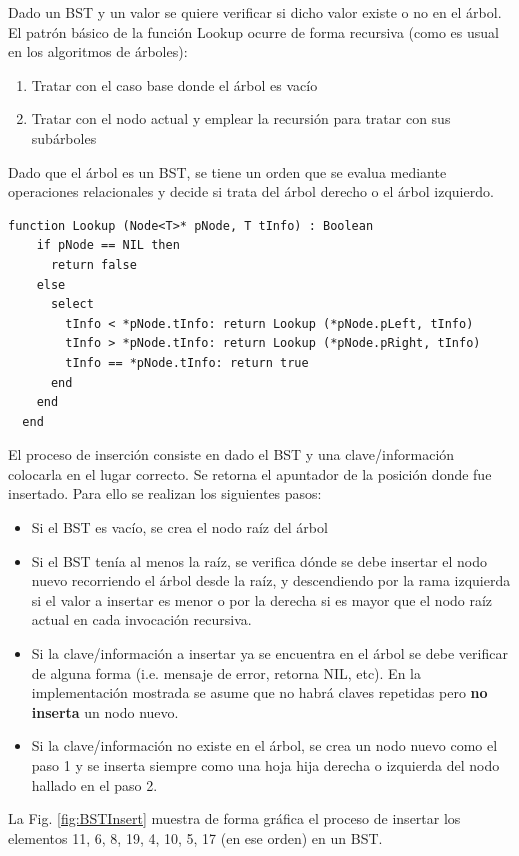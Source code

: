 Dado un BST y un valor se quiere verificar si dicho valor existe o no en el árbol. El patrón básico de la función Lookup ocurre de forma recursiva (como es usual en los algoritmos de árboles): 
\begin{enumerate}
\item Tratar con el caso base donde el árbol es vacío
\item Tratar con el nodo actual y emplear la recursión para tratar con sus subárboles
\end{enumerate}

Dado que el árbol es un BST, se tiene un orden que se evalua mediante operaciones relacionales y decide si trata del árbol derecho o el árbol izquierdo.

\begin{lstlisting}[upquote=true, language=pseudo]
  function Lookup (Node<T>* pNode, T tInfo) : Boolean
    if pNode == NIL then
      return false
    else
      select
        tInfo < *pNode.tInfo: return Lookup (*pNode.pLeft, tInfo)
        tInfo > *pNode.tInfo: return Lookup (*pNode.pRight, tInfo)
        tInfo == *pNode.tInfo: return true
      end
    end
  end
\end{lstlisting}

El proceso de inserción consiste en dado el BST y una clave/información colocarla en el lugar correcto. Se retorna el apuntador de la posición donde fue insertado. Para ello se realizan los siguientes pasos:
\begin{itemize}
\item Si el BST es vacío, se crea el nodo raíz del árbol
\item Si el BST tenía al menos la raíz, se verifica dónde se debe insertar el nodo nuevo recorriendo el árbol desde la raíz, y descendiendo por la rama izquierda si el valor a insertar es menor o por la derecha si es mayor que el nodo raíz actual en cada invocación recursiva.
\item Si la clave/información a insertar ya se encuentra en el árbol se debe verificar de alguna forma (i.e. mensaje de error, retorna NIL, etc). En la implementación mostrada se asume que no habrá claves repetidas pero \textbf{no inserta} un nodo nuevo.
\item Si la clave/información no existe en el árbol, se crea un nodo nuevo como el paso 1 y se inserta siempre como una hoja hija derecha o izquierda del nodo hallado en el paso 2.
\end{itemize}

La Fig. \ref{fig:BSTInsert} muestra de forma gráfica el proceso de insertar los elementos 11, 6, 8, 19, 4, 10, 5, 17 (en ese orden) en un BST.

